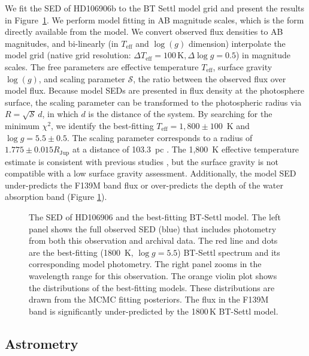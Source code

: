 \documentclass[twocolumn, trackchanges]{aastex62}
\newcommand{\teff}{\ensuremath{T_{\mathrm{eff}}}\xspace}
\newcommand{\logg}{\ensuremath{\log(g)}\xspace}
\begin{document}
We fit the SED of HD106906b to the BT Settl model grid \citep[][]{Allard2012} and present the results in Figure~\ref{fig:SED}. We perform model fitting in AB magnitude scales, which is the form directly available from the model.  We convert observed flux {densities} to AB magnitudes, and bi-linearly (in \teff and \logg dimension) interpolate the model grid (native grid resolution: $\Delta \teff=100\,\mbox{K}, \Delta \log g=0.5$) in magnitude scales. The free parameters are effective temperature $\teff$, surface gravity $\logg$, and scaling parameter $\mathcal{S}$, the ratio between the observed flux over model flux. Because model SEDs are presented in flux {density} at the photosphere surface, the scaling parameter can be transformed to the photospheric radius via $R=\sqrt{\mathcal{S}}\,d$, in which $d$ is the distance of the system. By searching for the minimum $\chi^{2}$, we identify the best-fitting $T_{\mathrm{eff}}=1,800\pm100$~K and $\log g=5.5\pm0.5$.  The scaling parameter corresponds to a radius of  $1.775\pm0.015R_{\mathrm{Jup}}$ at a distance of 103.3~pc \citep{Gaia2018,Gaia2016}. The 1,800~K effective temperature estimate is consistent with previous studies \citep{Bailey2013,Wu2016}, but the surface gravity is not compatible with a low surface gravity assessment. Additionally, the model SED under-predicts the F139M band flux or over-predicts the depth of the water absorption band (Figure \ref{fig:SED}).

\begin{figure}
  \centering
{}
  \caption{The SED of HD106906 and the best-fitting BT-Settl model. The left panel shows the full observed SED (blue) that includes photometry from both this observation and archival data. The red line and dots are the best-fitting (1800~K, $\log g=5.5$) BT-Settl spectrum \citep[rebinned to $R\sim100$ in a flux conserved manner, ][]{Allard2012} and its corresponding model photometry.  The right panel zooms in the wavelength range for this observation. The orange violin plot shows the  distributions of the best-fitting models. These distributions are drawn from the MCMC fitting posteriors. The flux in the F139M band is significantly under-predicted by the 1800\,K BT-Settl model.}
  \label{fig:SED}
\end{figure}

\subsection{Astrometry}
\label{sec:astrometry}
\end{document}

